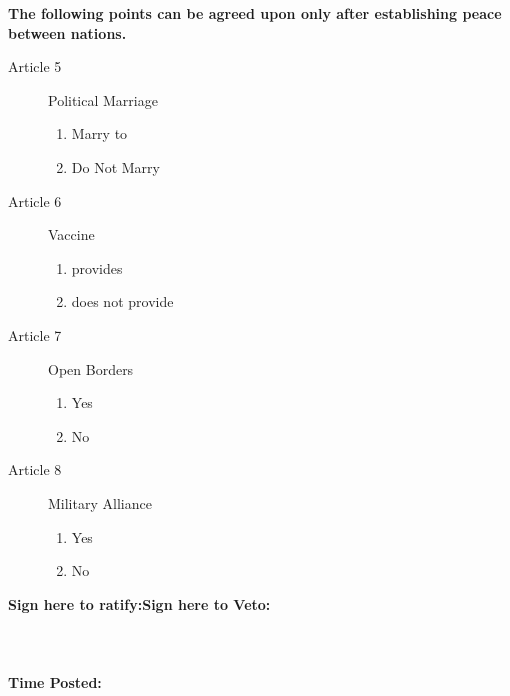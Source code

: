 \documentclass[white]{NeptuneBall}
\begin{document}
{\bf The following points can be agreed upon only after establishing peace between nations.}
\begin{description}
\item[Article 5] Political Marriage
  \begin{multicols}{2}
  \begin{enumerate}
  \item Marry \cPrince{} to \cPrincess{}
  \item Do Not Marry
  \end{enumerate}
	\end{multicols}
\item[Article 6] \cPolio{} Vaccine
	\begin{multicols}{2}
  \begin{enumerate}
  \item \pAtlantis{} provides
  \item \pAtlantis{} does not provide
  \end{enumerate}
	\end{multicols}
\item[Article 7] Open Borders
  \begin{multicols}{2}
  \begin{enumerate}
  \item Yes
  \item No
  \end{enumerate}
	\end{multicols}
\item[Article 8] Military Alliance
  \begin{multicols}{2}
  \begin{enumerate}
  \item Yes
  \item No
  \end{enumerate}
	\end{multicols}
\end{description}

{\bf Sign here to ratify:\qquad \qquad \qquad \qquad \qquad \qquad \qquad \qquad \qquad Sign here to Veto:\\ \\ \\ \\

Time Posted:}
\end{document}

